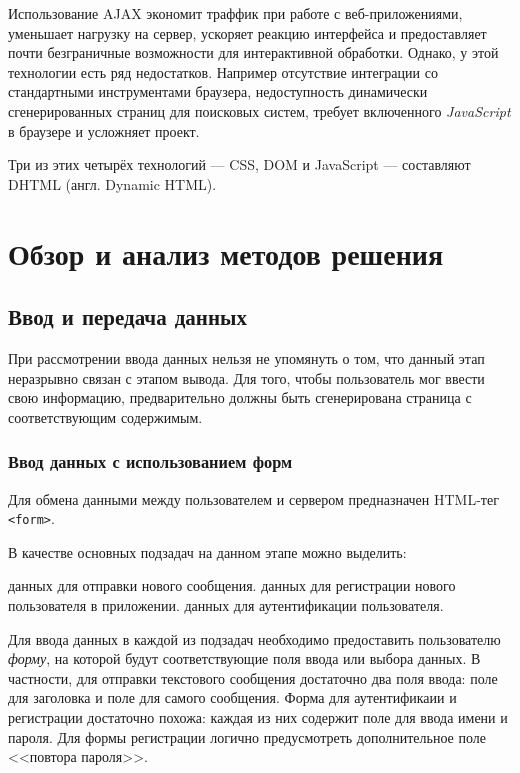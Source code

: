 \documentclass[a4paper]{article}
\begin{document}
Использование AJAX экономит траффик при работе с веб-приложениями, уменьшает нагрузку на сервер, ускоряет реакцию интерфейса и предоставляет почти безграничные возможности для интерактивной обработки. Однако, у этой технологии есть ряд недостатков. Например отсутствие интеграции со стандартными инструментами браузера, недоступность динамически сгенерированных страниц для поисковых систем, требует включенного \textit{JavaScript} в браузере и усложняет проект.

Три из этих четырёх технологий — CSS, DOM и JavaScript — составляют DHTML (англ. Dynamic HTML).

\section{Обзор и анализ методов решения}

\subsection{Ввод и передача данных}

При рассмотрении ввода данных нельзя не упомянуть о том, что данный этап неразрывно связан с этапом вывода. Для того, чтобы пользователь мог ввести свою информацию, предварительно должны быть сгенерирована страница с соответствующим содержимым.

\subsubsection{Ввод данных с использованием форм}

Для обмена данными между пользователем и сервером предназначен HTML-тег \texttt{<form>}.

В качестве основных подзадач на данном этапе можно выделить:

\begin{itemize}
 данных для отправки нового сообщения.
 данных для регистрации нового пользователя в приложении.
 данных для аутентификации пользователя.
\end{itemize}

Для ввода данных в каждой из подзадач необходимо предоставить пользователю \textit{форму}, на которой будут соответствующие поля ввода или выбора данных. В частности, для отправки текстового сообщения достаточно два поля ввода: поле для заголовка и поле для самого сообщения. Форма для аутентификаии и регистрации достаточно похожа: каждая из них содержит поле для ввода имени и пароля. Для формы регистрации логично предусмотреть дополнительное поле <<повтора пароля>>.
\end{document}
